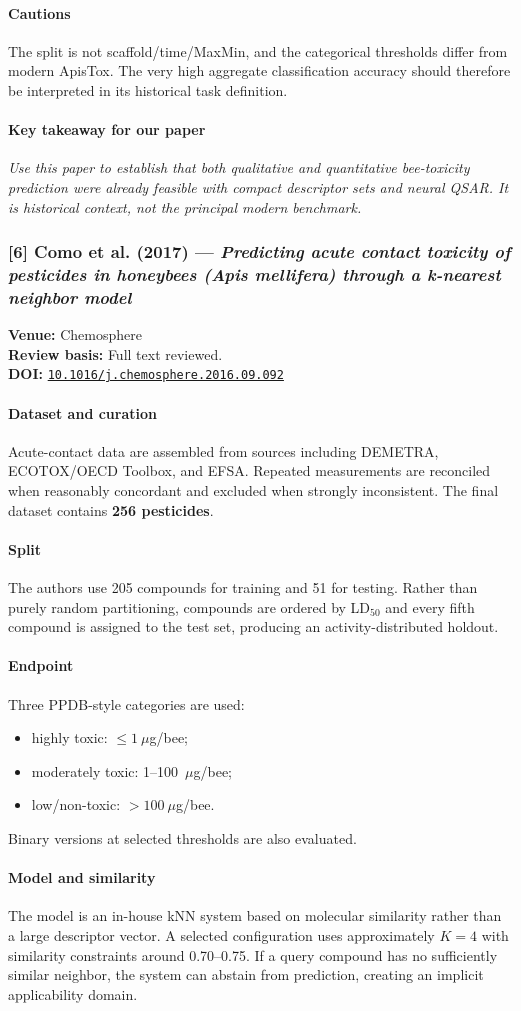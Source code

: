 \documentclass[11pt]{article}
\newcommand{\reviewfield}[2]{\paragraph{#1}#2}
\newcommand{\keytakeaway}[1]{\paragraph{Key takeaway for our paper}\emph{#1}}
\newcommand{\paperdoi}[1]{\href{https://doi.org/#1}{\texttt{#1}}}
\begin{document}
\reviewfield{Cautions}{
The split is not scaffold/time/MaxMin, and the categorical thresholds differ from modern ApisTox. The very high aggregate classification accuracy should therefore be interpreted in its historical task definition.
}

\keytakeaway{Use this paper to establish that both qualitative and quantitative bee-toxicity prediction were already feasible with compact descriptor sets and neural QSAR. It is historical context, not the principal modern benchmark.}

\subsubsection{[6] Como et al. (2017) --- \textit{Predicting acute contact toxicity of pesticides in honeybees (Apis mellifera) through a k-nearest neighbor model}}
\textbf{Venue:} Chemosphere\\
\textbf{Review basis:} Full text reviewed.\\
\textbf{DOI:} \paperdoi{10.1016/j.chemosphere.2016.09.092}

\reviewfield{Dataset and curation}{
Acute-contact data are assembled from sources including DEMETRA, ECOTOX/OECD Toolbox, and EFSA. Repeated measurements are reconciled when reasonably concordant and excluded when strongly inconsistent. The final dataset contains \textbf{256 pesticides}.
}

\reviewfield{Split}{
The authors use 205 compounds for training and 51 for testing. Rather than purely random partitioning, compounds are ordered by LD$_{50}$ and every fifth compound is assigned to the test set, producing an activity-distributed holdout.
}

\reviewfield{Endpoint}{
Three PPDB-style categories are used:
\begin{itemize}
    \item highly toxic: $\leq1~\mu$g/bee;
    \item moderately toxic: 1--100~$\mu$g/bee;
    \item low/non-toxic: $>100~\mu$g/bee.
\end{itemize}
Binary versions at selected thresholds are also evaluated.
}

\reviewfield{Model and similarity}{
The model is an in-house kNN system based on molecular similarity rather than a large descriptor vector. A selected configuration uses approximately $K=4$ with similarity constraints around 0.70--0.75. If a query compound has no sufficiently similar neighbor, the system can abstain from prediction, creating an implicit applicability domain.
}
\end{document}
